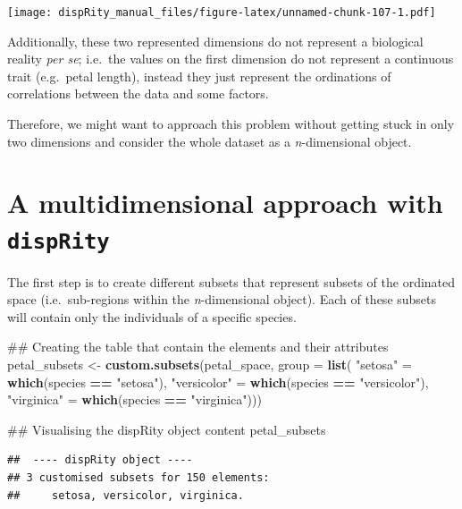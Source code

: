 \documentclass[]{book}
\newenvironment{Shaded}{\begin{snugshade}}{\end{snugshade}}
\newcommand{\KeywordTok}[1]{\textcolor[rgb]{0.13,0.29,0.53}{\textbf{#1}}}
\newcommand{\DataTypeTok}[1]{\textcolor[rgb]{0.13,0.29,0.53}{#1}}
\newcommand{\StringTok}[1]{\textcolor[rgb]{0.31,0.60,0.02}{#1}}
\newcommand{\OperatorTok}[1]{\textcolor[rgb]{0.81,0.36,0.00}{\textbf{#1}}}
\newcommand{\NormalTok}[1]{#1}
\theoremstyle{definition}
\theoremstyle{definition}
\theoremstyle{remark}
\begin{document}
\texttt{[image: dispRity\_manual\_files/figure-latex/unnamed-chunk-107-1.pdf]}

Additionally, these two represented dimensions do not represent a
biological reality \emph{per se}; i.e.~the values on the first dimension
do not represent a continuous trait (e.g.~petal length), instead they
just represent the ordinations of correlations between the data and some
factors.

Therefore, we might want to approach this problem without getting stuck
in only two dimensions and consider the whole dataset as a
\emph{n}-dimensional object.

\section{\texorpdfstring{A multidimensional approach with
\texttt{dispRity}}{A multidimensional approach with dispRity}}\label{a-multidimensional-approach-with-disprity}

The first step is to create different subsets that represent subsets of
the ordinated space (i.e.~sub-regions within the \emph{n}-dimensional
object). Each of these subsets will contain only the individuals of a
specific species.

\begin{Shaded}
\begin{Highlighting}[]
\NormalTok{## Creating the table that contain the elements and their attributes}
\NormalTok{petal_subsets <-}\StringTok{ }\KeywordTok{custom.subsets}\NormalTok{(petal_space, }\DataTypeTok{group =} \KeywordTok{list}\NormalTok{(}
                                \StringTok{"setosa"}\NormalTok{ =}\StringTok{ }\KeywordTok{which}\NormalTok{(species }\OperatorTok{==}\StringTok{ "setosa"}\NormalTok{),}
                                \StringTok{"versicolor"}\NormalTok{ =}\StringTok{ }\KeywordTok{which}\NormalTok{(species }\OperatorTok{==}\StringTok{ "versicolor"}\NormalTok{),}
                                \StringTok{"virginica"}\NormalTok{ =}\StringTok{ }\KeywordTok{which}\NormalTok{(species }\OperatorTok{==}\StringTok{ "virginica"}\NormalTok{)))}

\NormalTok{## Visualising the dispRity object content}
\NormalTok{petal_subsets}
\end{Highlighting}
\end{Shaded}

\begin{verbatim}
##  ---- dispRity object ---- 
## 3 customised subsets for 150 elements:
##     setosa, versicolor, virginica.
\end{verbatim}
\end{document}
